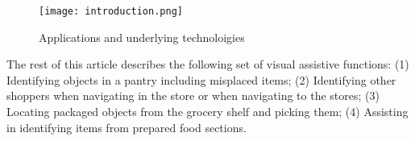 \begin{figure}[!htb]
\centering
\texttt{[image: introduction.png]}
\caption{Applications and underlying technoloigies}
\label{fig:introduction}
\end{figure} 



The rest of this article describes the following set of visual
assistive functions: (1) Identifying objects in a pantry including
misplaced items; (2) Identifying other shoppers when navigating in the
store or when navigating to the stores; (3) Locating packaged objects
from the grocery shelf and picking them; (4) Assisting in identifying
items from prepared food sections. 

